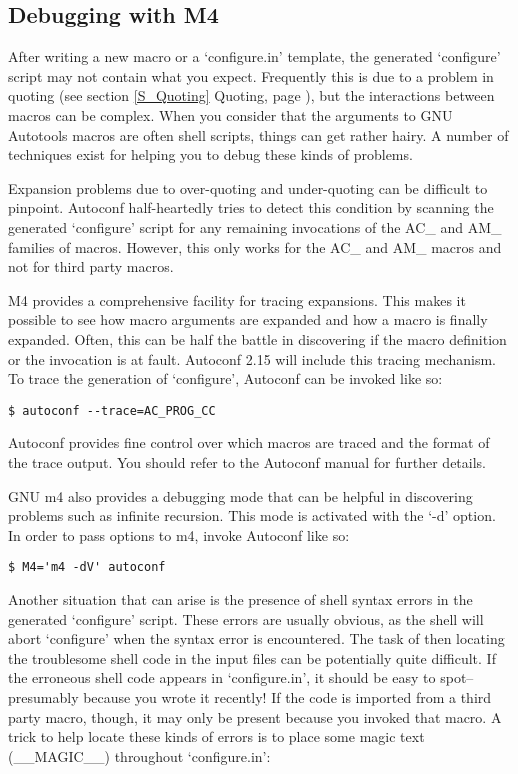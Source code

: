 \subsection{Debugging with M4}

After writing a new macro or a `configure.in' template, the 
generated `configure' script may not contain what you expect. Frequently 
this is due to a problem in quoting (see section \ref{S_Quoting} Quoting,
page \pageref{S_Quoting}), but the interactions between macros can be complex.
When you consider that the arguments to GNU Autotools macros are often shell 
scripts, things can get rather hairy. A number of techniques exist for 
helping you to debug these kinds of problems.

Expansion problems due to over-quoting and under-quoting can be difficult to pinpoint. Autoconf half-heartedly tries to detect this condition by scanning the generated `configure' script for any remaining invocations of the AC\_{} and AM\_{} families of macros. However, this only works for the AC\_{} and AM\_{} macros and not for third party macros.

M4 provides a comprehensive facility for tracing expansions. This makes it possible to see how macro arguments are expanded and how a macro is finally expanded. Often, this can be half the battle in discovering if the macro definition or the invocation is at fault. Autoconf 2.15 will include this tracing mechanism. To trace the generation of `configure', Autoconf can be invoked like so:

 	
\begin{verbatim}
$ autoconf --trace=AC_PROG_CC
\end{verbatim}

Autoconf provides fine control over which macros are traced and the format of the trace output. You should refer to the Autoconf manual for further details.

GNU m4 also provides a debugging mode that can be helpful in discovering problems such as infinite recursion. This mode is activated with the `-d' option. In order to pass options to m4, invoke Autoconf like so:

 	

\begin{verbatim}
$ M4='m4 -dV' autoconf
\end{verbatim}

Another situation that can arise is the presence of shell syntax errors in the 
generated `configure' script. These errors are usually obvious, as the shell 
will abort `configure' when the syntax error is encountered. The task of then 
locating the troublesome shell code in the input files can be potentially quite 
difficult. If the erroneous shell code appears in `configure.in', it should 
be easy to spot--presumably because you wrote it recently! If the code is 
imported from a third party macro, though, it may only be present because you 
invoked that macro. A trick to help locate these kinds of errors is to place 
some magic text (\_{}\_{}MAGIC\_{}\_{}) throughout `configure.in':

